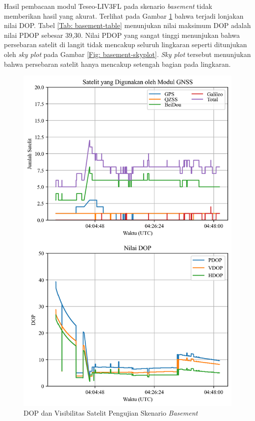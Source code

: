 Hasil pembacaan modul Teseo-LIV3FL pada skenario \textit{basement} tidak memberikan hasil yang akurat. Terlihat pada Gambar \ref{Fig: basement-sats_dop} bahwa terjadi lonjakan nilai DOP. Tabel \ref{Tab: basement-table} menunjukan nilai maksimum DOP adalah nilai PDOP sebesar 39,30. Nilai PDOP yang sangat tinggi menunjukan bahwa persebaran satelit di langit tidak mencakup seluruh lingkaran seperti ditunjukan oleh \textit{sky plot} pada Gambar \ref{Fig: basement-skyplot}. \textit{Sky plot} tersebut menunjukan bahwa persebaran satelit hanya mencakup setengah bagian pada lingkaran.

\begin{figure}[H]
	\centering
	\includegraphics[width=12cm]{contents/chapter-4/1-skenario-basement/sats_dop.png}
	\caption{DOP dan Visibilitas Satelit Pengujian Skenario \textit{Basement}}
	\label{Fig: basement-sats_dop}
\end{figure}

